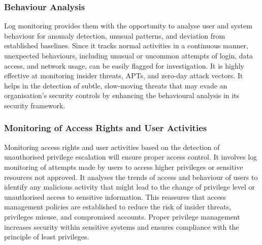 \subsubsection{Behaviour Analysis}

Log monitoring provides them with the opportunity to analyse user and system behaviour for anomaly detection, unusual patterns, and deviation from established baselines. Since it tracks normal activities in a continuous manner, unexpected behaviours, including unusual or uncommon attempts of login, data access, and network usage, can be easily flagged for investigation. It is highly effective at monitoring insider threats, APTs, and zero-day attack vectors. It helps in the detection of subtle, slow-moving threats that may evade an organisation's security controls by enhancing the behavioural analysis in its security framework. \cite{nicholas2012evidence}



\subsubsection{Monitoring of Access Rights and User Activities}Monitoring access rights and user activities based on the detection of unauthorised privilege escalation will ensure proper access control. It involves log monitoring of attempts made by users to access higher privileges or sensitive resources not approved. It analyses the trends of access and behaviour of users to identify any malicious activity that might lead to the change of privilege level or unauthorised access to sensitive information. This reassures that access management policies are established to reduce the risk of insider threats, privileges misuse, and compromised accounts. Proper privilege management increases security within sensitive systems and ensures compliance with the principle of least privileges. \cite{setiyadi2018information}








